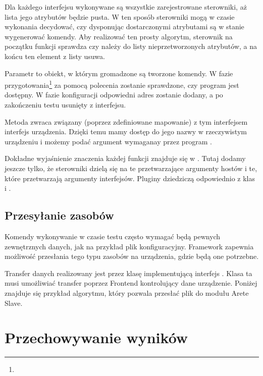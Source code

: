\documentclass[00-praca-magisterska.tex]{subfiles}
\begin{document}
Dla każdego interfejsu wykonywane są wszystkie zarejestrowane sterowniki, aż
lista jego atrybutów będzie pusta. W ten sposób sterowniki mogą w czasie
wykonania decydować, czy dysponując dostarczonymi atrybutami są w stanie
wygenerować komendy. Aby realizować ten prosty algorytm, sterownik na początku
funkcji  sprawdza czy  należy do listy
nieprzetworzonych atrybutów, a na końcu ten element z listy usuwa.

Parametr  to obiekt, w którym gromadzone są tworzone komendy. W fazie
przygotowania\footnote{} za pomocą polecenia 
zostanie sprawdzone, czy program  jest dostępny. W fazie konfiguracji
odpowiedni adres zostanie dodany, a po zakończeniu testu usunięty z interfejsu.

Metoda  zwraca związany (poprzez zdefiniowane
mapowanie) z tym interfejsem interfejs urządzenia. Dzięki temu mamy dostęp do
jego nazwy w rzeczywistym urządzeniu i możemy podać argument wymaganay przez
program .

Dokładne wyjaśnienie znaczenia każdej funkcji znajduje się w . Tutaj dodamy jeszcze tylko, że sterowniki dzielą się na te
przetwarzające argumenty hostów i te, które przetwarzają argumenty interfejsów.
Pluginy dziedziczą odpowiednio z klas  i
.

\subsection{Przesyłanie zasobów}

Komendy wykonywanie w czasie testu często wymagać będą pewnych zewnętrznych
danych, jak na przykład plik konfiguracyjny. Framework zapewnia możliwość
przesłania tego typu zasobów na urządzenia, gdzie będą one potrzebne.

Transfer danych realizowany jest przez klasę implementującą interfejs
. Klasa ta musi umożliwiać transfer poprzez Frontend kontrolujący
dane urządzenie. Poniżej znajduje się przykład algorytmu, który pozwala przesłać
plik do modułu Arete Slave.


\section{Przechowywanie wyników}

\end{document}
